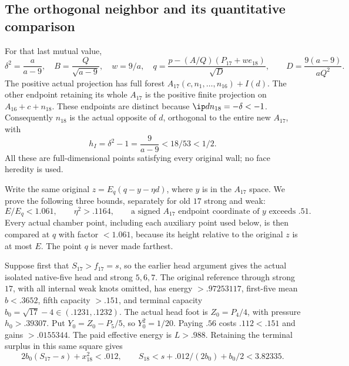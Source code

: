 \subsection{The orthogonal neighbor and its quantitative comparison}
\label{app:B18A17comparison}
For that last mutual value,
\[
 \delta^2=\frac a{a-9},\quad B=\frac Q{\sqrt{a-9}},\quad w=9/a,\quad
 q=\frac{p-(A/Q)(P_{17}+we_{18})}{\sqrt D},\qquad
 D=\frac{9(a-9)}{aQ^2}.
\]
The positive actual projection has full forest
\(A_{17}(c,n_1,\ldots,n_{16})+I(d)\).
The other endpoint retaining its whole \(A_{17}\) is the positive
finite projection on \(A_{16}+c+n_{18}\). These endpoints are distinct
because \(\ip d{n_{18}}=-\delta<-1\).
Consequently \(n_{18}\) is the actual opposite of \(d\), orthogonal
to the entire new \(A_{17}\), with
\[
 h_I=\delta^2-1=\frac9{a-9}<18/53<1/2.
\]
All these are full-dimensional points satisfying every original wall;
no face heredity is used.

Write the same original \(z=E_q(q-y-\eta d)\), where \(y\)
is in the \(A_{17}\) space. We prove the following three bounds,
separately for old \(17\) strong and weak:
\begin{equation}\label{eq:B18A17interface}
 E/E_q<1.061,\qquad \eta^2>.1164,\qquad
 \text{a signed \(A_{17}\) endpoint coordinate of \(y\) exceeds } .51 .
\end{equation}
Every actual chamber point, including each auxiliary point used below,
is then compared at \(q\) with factor \(<1.061\), because its height
relative to the original \(z\) is at most \(E\).
The point \(q\) is never made farthest.

Suppose first that \(S_{17}>f_{17}=s\), so the earlier head argument
gives the actual isolated native-five head and strong \(5,6,7\).
The original reference through strong \(17\), with all internal
weak knots omitted, has energy \(>.97253117\),
first-five mean \(b<.3652\), fifth capacity \(>.151\), and
terminal capacity \(b_0=\sqrt{17}-4\in(.1231,.1232)\).
The actual head foot is \(Z_0=P_4/4\), with pressure
\(h_0>.39307\). Put \(Y_0=Z_0-P_5/5\), so \(Y_0^2=1/20\).
Paying \(.56\) costs \(.112<.151\) and gains \(>.0155344\).
The paid effective energy is \(L>.988\). Retaining the terminal
surplus in this same square gives
\[
 2b_0(S_{17}-s)+x_{18}^2<.012,\qquad
 S_{18}<s+.012/(2b_0)+b_0/2<3.82335 .
\]

